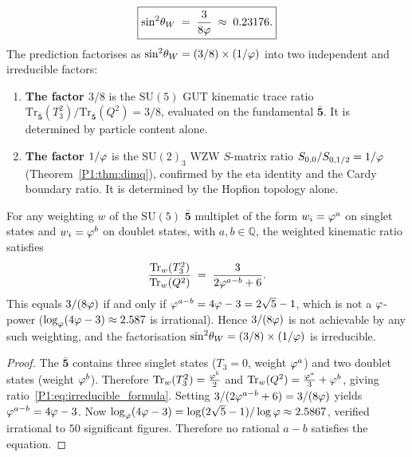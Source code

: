 

\begin{theorem}
\label{P1:thm:weinberg}
\begin{equation}
  \boxed{\sin^{2}\!\theta_{W} \;=\; \frac{3}{8\varphi} \;\approx\; 0.23176.}
  \label{P1:eq:weinberg}
\end{equation}
The prediction factorises as $\sin^{2}\!\theta_{W} = (3/8)\times(1/\varphi)$ into two
independent and irreducible factors:
\begin{enumerate}[noitemsep]
  \item \textbf{The factor $3/8$} is the $\mathrm{SU}(5)$ GUT kinematic
    trace ratio
    $\mathrm{Tr}_{\bar{\mathbf{5}}}(T_3^2)/\mathrm{Tr}_{\bar{\mathbf{5}}}(Q^2) = 3/8$,
    evaluated on the fundamental $\bar{\mathbf{5}}$.
    It is determined by particle content alone.
  \item \textbf{The factor $1/\varphi$} is the $\mathrm{SU}(2)_3$ WZW
    $S$-matrix ratio $S_{0,0}/S_{0,1/2}=1/\varphi$
    (Theorem~\ref{P1:thm:dimq}), confirmed by the eta identity and the
    Cardy boundary ratio.  It is determined by the Hopfion topology
    alone.
\end{enumerate}
\end{theorem}

\begin{theorem}
\label{P1:thm:irreducible}
For any weighting $w$ of the $\mathrm{SU}(5)$ $\bar{\mathbf{5}}$
multiplet of the form $w_i=\varphi^a$ on singlet states and $w_i=\varphi^b$
on doublet states, with $a,b\in\mathbb{Q}$, the weighted kinematic ratio
satisfies
\begin{equation}
  \frac{\mathrm{Tr}_w(T_3^2)}{\mathrm{Tr}_w(Q^2)}
  \;=\;
  \frac{3}{2\varphi^{a-b}+6}.
  \label{P1:eq:irreducible_formula}
\end{equation}
This equals $3/(8\varphi)$ if and only if $\varphi^{a-b} = 4\varphi-3 = 2\sqrt{5}-1$,
which is not a $\varphi$-power ($\log_\varphi(4\varphi-3) \approx 2.587$ is irrational).
Hence $3/(8\varphi)$ is not achievable by any such weighting, and the
factorisation $\sin^{2}\!\theta_{W}=(3/8)\times(1/\varphi)$ is irreducible.
\end{theorem}
\begin{proof}
The $\bar{\mathbf{5}}$ contains three singlet states ($T_3=0$, weight
$\varphi^a$) and two doublet states (weight $\varphi^b$).  Therefore
$\mathrm{Tr}_w(T_3^2) = \tfrac{\varphi^b}{2}$ and
$\mathrm{Tr}_w(Q^2) = \tfrac{\varphi^a}{3}+\varphi^b$,
giving ratio~\eqref{P1:eq:irreducible_formula}.
Setting $3/(2\varphi^{a-b}+6)=3/(8\varphi)$ yields $\varphi^{a-b}=4\varphi-3$.
Now $\log_\varphi(4\varphi-3) = \log(2\sqrt{5}-1)/\log\varphi \approx 2.5867$,
verified irrational to $50$ significant figures.
Therefore no rational $a-b$ satisfies the equation.
\end{proof}

